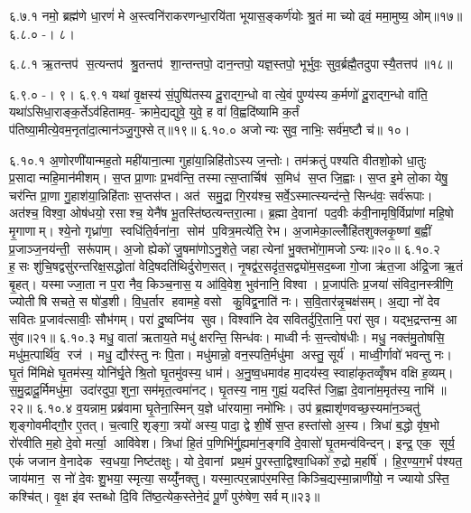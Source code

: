६.७.१
नमो॒ ब्रह्म॑णे धा॒रणं॑ मे अ॒स्त्वनि॑राकरणन्धा॒रयि॑ता भूयास॒ङ्कर्ण॑योः  श्रु॒तं मा च्योढ्वं॒ ममा॒मुष्य॒ ओम्॥१७॥
६.८.०
-। ८।
\anuvakamend

६.८.१
ऋ॒तन्तप॑ स॒त्यन्तप॑ श्रु॒तन्तप॑ शा॒न्तन्तपो॒ दान॒न्तपो॒ यज्ञ॒स्तपो॒ भूर्भुवः॒ सुव॒र्ब्रह्मै॒तदुपास्यै॒तत्तप॑॥१८॥
\anuvakamend

६.९.०
-। ९।
६.९.१
यथा॑ वृ॒क्षस्य॑ सं॒पुष्पि॑तस्य दू॒राद्ग॒न्धो वात्ये॒वं पुण्य॑स्य क॒र्मणो॑ दू॒राद्ग॒न्धो वा॑ति॒ यथा॑ऽसिधा॒राङ्क॒र्तेऽव॑हितामव॒- क्रामे॒द्यद्युवे॒ युवे॒ ह वा॑ वि॒ह्वदि॑ष्यामि क॒र्तं प॑तिष्या॒मीत्ये॒वम॒नृता॑दा॒त्मान॑ञ्जु॒गुफ्सेत्॥१९॥
६.१०.०
अजोन्यः सुव॒ नाभिः॒ सर्व॑म॒ष्टौ च॑॥ १०।
\anuvakamend

६.१०.१
अ॒णोरणी॑यान्मह॒तो मही॑याना॒त्मा गुहा॑या॒न्निहि॑तोऽस्य ज॒न्तोः। तम॑क्रतुं पश्यति वीतशो॒को धा॒तुः प्र॒सादान्महि॒मान॑मीशम्। स॒प्त प्रा॒णाः प्र॒भव॑न्ति॒ तस्मात्स॒प्तार्चिष॑ स॒मिध॑ स॒प्त जि॒ह्वाः। स॒प्त इ॒मे लो॒का येषु॒ चर॑न्ति प्रा॒णा गु॒हाश॑या॒न्निहि॑ताः स॒प्तस॑प्त। अत॑ समु॒द्रा गि॒रय॑श्च॒ सर्वे॒ऽस्मात्स्यन्द॑न्ते॒ सिन्ध॑वः॒ सर्व॑रूपाः। अत॑श्च॒ विश्वा॒ ओष॑धयो॒ रसाश्च॒ येनै॑ष भू॒तस्ति॑ष्ठत्यन्तरा॒त्मा। ब्र॒ह्मा दे॒वानां पद॒वीः क॑वी॒नामृषि॒र्विप्रा॑णां महि॒षो मृ॒गाणाम्। श्ये॒नो गृध्रा॑णा॒ स्वधि॑ति॒र्वना॑ना॒ सोम॑ प॒वित्र॒मत्ये॑ति॒ रेभ\sn{}। अ॒जामेका॒ल्लोँहि॑तशुक्लकृ॒ष्णां ब॒ह्वीं प्र॒जाञ्ज॒नय॑न्ती॒ सरू॑पाम्। अ॒जो ह्येको॑ जु॒षमा॑णोऽनु॒शेते॒ जहात्येनां भु॒क्तभो॑गा॒मजोऽन्यः॥२०॥
६.१०.२
ह॒सः  शु॑चि॒षद्वसु॑रन्तरिक्ष॒सद्धोता॑ वेदि॒षदति॑थिर्दुरोण॒सत्। नृ॒षद्व॑र॒सदृ॑त॒सद्व्यो॑म॒सद॒ब्जा गो॒जा ऋ॑त॒जा अ॑द्रि॒जा ऋ॒तं बृ॒हत्। यस्माज्जा॒ता न प॒रा नैव॒ किञ्च॒नास॒ य आ॑वि॒वेश॒ भुव॑नानि॒ विश्वा। प्र॒जाप॑तिः प्र॒जया॑ संविदा॒नस्त्रीणि॒ ज्योतीषि सचते॒ स षो॑ड॒शी। वि॒ध॒र्तार हवामहे॒ वसो कु॒विद्व॒नाति॑ नः। स॒वि॒तार॑न्नृ॒चक्ष॑सम्। अ॒द्या नो॑ देव सवितः प्र॒जाव॑त्सावीः॒ सौभ॑गम्। परा॑ दु॒ष्वप्नि॑य सुव। विश्वा॑नि देव सवितर्दुरि॒तानि॒ परा॑ सुव। यद्भ॒द्रन्तन्म॒ आ सु॑व॥२१॥
६.१०.३
मधु॒ वाता॑ ऋताय॒ते मधु॑ क्षरन्ति॒ सिन्ध॑वः। माध्वीर्नः स॒न्त्वोष॑धीः। मधु॒ नक्त॑मु॒तोषसि॒ मधु॑म॒त्पार्थि॑व॒ रज॑। मधु॒ द्यौर॑स्तु नः पि॒ता। मधु॑मान्नो॒ वन॒स्पति॒र्मधु॑मा अस्तु॒ सूर्य॑। माध्वी॒र्गावो॑ भवन्तु नः। घृ॒तं मि॑मिक्षे घृ॒तम॑स्य॒ योनि॑र्घृ॒ते श्रि॒तो घृ॒तमु॑वस्य॒ धाम॑। अ॒नु॒ष्व॒धमाव॑ह मा॒दय॑स्व॒ स्वाहा॑कृतव्वृँषभ वक्षि ह॒व्यम्। स॒मु॒द्रादू॒र्मिमधु॑मा॒ उदा॑रदुपा॒शुना॒ सम॑मृत॒त्वमा॑नट्। घृ॒तस्य॒ नाम॒ गुह्यं॒ यदस्ति॑ जि॒ह्वा दे॒वाना॑म॒मृत॑स्य॒ नाभि॑॥२२॥
६.१०.४
व॒यन्नाम॒ प्रब्र॑वामा घृ॒तेना॒स्मिन् य॒ज्ञे धा॑रयामा॒ नमो॑भिः। उप॑ ब्र॒ह्माशृ॑णवच्छ॒स्यमा॑न॒ञ्चतु॑ शृङ्गोवमीद्गौ॒र ए॒तत्। च॒त्वारि॒ शृङ्गा॒ त्रयो॑ अस्य॒ पादा॒ द्वे शी॒र्\mbox{}षे स॒प्त हस्ता॑सो अ॒स्य। त्रिधा॑ ब॒द्धो वृ॑ष॒भो रो॑रवीति म॒हो दे॒वो मर्त्या॒ आवि॑वेश। त्रिधा॑ हि॒तं प॒णिभि॑र्गु॒ह्यमा॑न॒ङ्गवि॑ दे॒वासो॑ घृ॒तमन्व॑विन्दन्। इन्द्र॒ एक॒ सूर्य॒ एकं॑ जजान वे॒नादेक स्व॒धया॒ निष्ट॑तक्षुः। यो दे॒वानां प्रथ॒मं पु॒रस्ता॒द्विश्वा॒धिको॑ रु॒द्रो म॒हर्\mbox{}षि॑। हि॒र॒ण्य॒ग॒र्भं प॑श्यत॒ जाय॑मान॒ स नो॑ दे॒वः  शु॒भया॒ स्मृत्या॒ सय्युँ॑नक्तु। यस्मा॒त्पर॒न्नाप॑र॒मस्ति॒ किञ्चि॒द्यस्मा॒न्नाणी॑यो॒ न ज्यायोऽस्ति॒ कश्चि॑त्। वृ॒क्ष इ॑व स्तब्धो दि॒वि ति॑ष्ठ॒त्येक॒स्तेने॒दं पू॒र्णं पुरु॑षेण॒ सर्वम्॥२३॥
